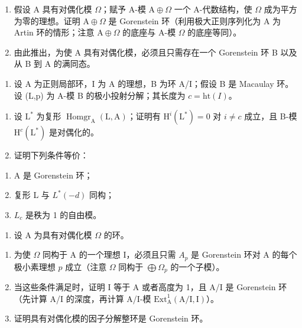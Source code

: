 \begin{enumerate}
\def\labelenumi{\alph{enumi})}
\item
  假设 A 具有对偶化模 \(\Omega\)；赋予 A-模 \(\mathrm{A} \oplus \Omega\) 一个 A-代数结构，使 \(\Omega\) 成为平方为零的理想。证明 \(\mathrm{A} \oplus \Omega\) 是 Gorenstein 环（利用极大正则序列化为 A 为 Artin 环的情形；注意 \(\mathrm{A} \oplus \Omega\) 的底座与 A-模 \(\Omega\) 的底座等同）。
\item
  由此推出，为使 A 具有对偶化模，必须且只需存在一个 Gorenstein 环 B 以及从 B 到 A 的满同态。
\end{enumerate}

\begin{enumerate}
\def\labelenumi{\arabic{enumi})}
\setcounter{enumi}{1}
\tightlist
\item
  设 A 为正则局部环，I 为 A 的理想，B 为环 A/I；假设 B 是 Macaulay 环。设 (L,p) 为 A-模 B 的极小投射分解；其长度为 \(c = \text{ht}(I)\)。
\end{enumerate}

\begin{enumerate}
\def\labelenumi{\alph{enumi})}
\item
  设 \(\mathrm{L}^*\) 为复形 \(\operatorname{Homgr}_{\mathrm{A}}(\mathrm{L},\mathrm{A})\)；证明有 \(\mathrm{H}^{i}(\mathrm{L}^{*}) = 0\) 对 \(i\neq c\) 成立，且 B-模 \(\mathrm{H}^c (\mathrm{L}^*)\) 是对偶化的。
\item
  证明下列条件等价：
\end{enumerate}

\begin{enumerate}
\def\labelenumi{(\roman{enumi})}
\item
  A 是 Gorenstein 环；
\item
  复形 L 与 \(L^{*}(-d)\) 同构；
\item
  \(L_{c}\) 是秩为 1 的自由模。
\end{enumerate}

\begin{enumerate}
\def\labelenumi{\arabic{enumi})}
\setcounter{enumi}{2}
\tightlist
\item
  设 A 为具有对偶化模 \(\Omega\) 的环。
\end{enumerate}

\begin{enumerate}
\def\labelenumi{\alph{enumi})}
\item
  为使 \(\Omega\) 同构于 A 的一个理想 I，必须且只需 \(A_{p}\) 是 Gorenstein 环对 A 的每个极小素理想 \(p\) 成立（注意 \(\Omega\) 同构于 \(\bigoplus \Omega_{p}\) 的一个子模）。
\item
  当这些条件满足时，证明 I 等于 A 或者高度为 1，且 A/I 是 Gorenstein 环（先计算 A/I 的深度，再计算 A/I-模 \(\mathrm{Ext}_{\mathrm{A}}^{1}(\mathrm{A / I,I})\)）。
\item
  证明具有对偶化模的因子分解整环是 Gorenstein 环。
\end{enumerate}

